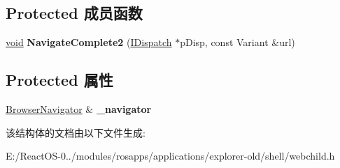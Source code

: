 \subsection*{Protected 成员函数}
\begin{DoxyCompactItemize}
\item 
\mbox{\label{struct_d_web_browser_events2_impl_a9e3253c38081355db75c8a32326938e8}} 
\hyperlink{interfacevoid}{void} {\bfseries Navigate\+Complete2} (\hyperlink{interface_i_dispatch}{I\+Dispatch} $\ast$p\+Disp, const Variant \&url)
\end{DoxyCompactItemize}
\subsection*{Protected 属性}
\begin{DoxyCompactItemize}
\item 
\mbox{\label{struct_d_web_browser_events2_impl_a3cfe3562f73ecf1f1f265354d1038c3d}} 
\hyperlink{struct_browser_navigator}{Browser\+Navigator} \& {\bfseries \+\_\+navigator}
\end{DoxyCompactItemize}


该结构体的文档由以下文件生成\+:\begin{DoxyCompactItemize}
\item 
E\+:/\+React\+O\+S-\/0../modules/rosapps/applications/explorer-\/old/shell/webchild.\+h\end{DoxyCompactItemize}
